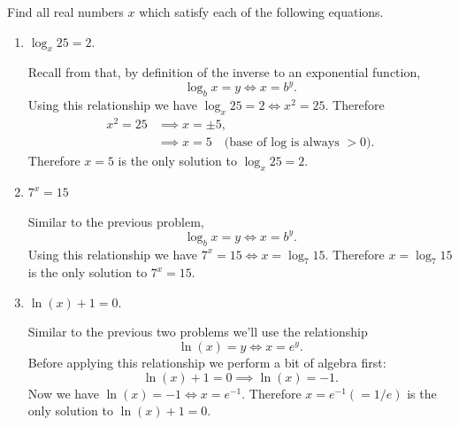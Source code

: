 \documentclass[nooutcomes]{ximera}
\begin{document}
\begin{problem}

  Find all real numbers $x$ which satisfy each of the following equations.
  \begin{enumerate}
    \item
      $\log_x 25 = 2$.
      \begin{freeResponse}
        Recall from that, by definition of the inverse to an exponential function,
        \[
        \log_b x = y \iff x = b^y.
        \]
        Using this relationship we have $\log_x 25 = 2 \iff x^2 = 25$.
        Therefore
        \begin{align*}
          x^2 = 25 &\implies x = \pm 5,\\
                   &\implies x = 5 \hspace{1em} \mbox{(base of log is always $>0$)}.
        \end{align*}
        Therefore $x = 5$ is the only solution to $\log_x 25 = 2$.
      \end{freeResponse}


    \item
      $7^x = 15$
      \begin{freeResponse}
        Similar to the previous problem,
        \[
        \log_b x = y \iff x = b^y .
        \]
        Using this relationship we have $7^x = 15  \iff x = \log_{7} 15$.
        Therefore $x = \log_7 15$ is the only solution to $7^x = 15$.
      \end{freeResponse}
      
    \item
      $\ln(x) + 1 = 0$.
      \begin{freeResponse}
        Similar to the previous two problems we'll use the relationship 
        \[
          \ln(x) = y \iff x = e^y.
        \]
        Before applying this relationship we perform a bit of algebra first:
        \[
          \ln(x) + 1 = 0 \implies \ln(x) = -1.
        \]
        Now we have $\ln(x) = -1 \iff x = e^{-1}$.
        Therefore $x = e^{-1} (= 1/e)$ is the only solution to $\ln(x) + 1 = 0$.
      \end{freeResponse}
  \end{enumerate}
\end{problem}
\end{document}
